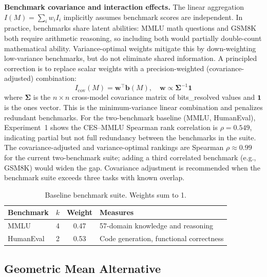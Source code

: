 \documentclass[12pt]{article}
\begin{document}
\noindent\textbf{Benchmark covariance and interaction effects.} The linear aggregation $I(M) = \sum_i w_i I_i$ implicitly assumes benchmark scores are independent. In practice, benchmarks share latent abilities: MMLU math questions and GSM8K both require arithmetic reasoning, so including both would partially double-count mathematical ability. Variance-optimal weights mitigate this by down-weighting low-variance benchmarks, but do not eliminate shared information. A principled correction is to replace scalar weights with a precision-weighted (covariance-adjusted) combination:
\begin{equation}
I_{\mathrm{cov}}(M) = \mathbf{w}^\top \mathbf{b}(M), \quad \mathbf{w} \propto \boldsymbol{\Sigma}^{-1}\mathbf{1}
\end{equation}
where $\boldsymbol{\Sigma}$ is the $n \times n$ cross-model covariance matrix of bits\_resolved values and $\mathbf{1}$ is the ones vector. This is the minimum-variance linear combination and penalizes redundant benchmarks. For the two-benchmark baseline (MMLU, HumanEval), Experiment~1 shows the CES--MMLU Spearman rank correlation is $\rho = 0.549$, indicating partial but not full redundancy between the benchmarks in the suite. The covariance-adjusted and variance-optimal rankings are Spearman $\rho \approx 0.99$ for the current two-benchmark suite; adding a third correlated benchmark (e.g., GSM8K) would widen the gap. Covariance adjustment is recommended when the benchmark suite exceeds three tasks with known overlap.

\begin{table}[H]
\centering
\begin{tabular}{lccl}
\toprule
\textbf{Benchmark} & $k$ & \textbf{Weight} & \textbf{Measures} \\
\midrule
MMLU \cite{hendrycks2021} & 4 & 0.47 & 57-domain knowledge and reasoning \\
HumanEval \cite{chen2021} & 2 & 0.53 & Code generation, functional correctness \\
\bottomrule
\end{tabular}
\caption{Baseline benchmark suite. Weights sum to 1.}
\end{table}

\subsection{Geometric Mean Alternative}
\label{sec:geometric-mean}
\end{document}
